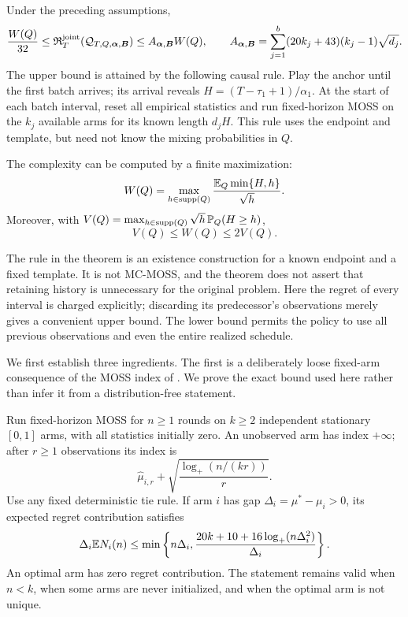 \begin{theorem}
\label{thm:random-positive}
Under the preceding assumptions,
\begin{equation}
 \frac{W(Q)}{32}
 \le \mathfrak R_T^{\mathrm{joint}}
       (\mathcal Q_{T,Q,\boldsymbol\alpha,\boldsymbol B})
 \le A_{\boldsymbol\alpha,\boldsymbol B}W(Q),
 \qquad
 A_{\boldsymbol\alpha,\boldsymbol B}
 =\sum_{j=1}^b(20k_j+43)(k_j-1)\sqrt{d_j}.
 \label{eq:stretch-minimax}
\end{equation}
The upper bound is attained by the following causal rule. Play the
anchor until the first batch arrives; its arrival reveals
$H=(T-\tau_1+1)/\alpha_1$. At the start of each batch interval, reset
all empirical statistics and run fixed-horizon MOSS on the $k_j$
available arms for its known length $d_jH$.
This rule uses the endpoint and template, but need not know the
mixing probabilities in $Q$.

The complexity can be computed by a finite maximization:
\begin{equation}
 W(Q)=\max_{h\in\operatorname{supp}(Q)}
            \frac{\mathbb E_Q\min\{H,h\}}{\sqrt h}.
 \label{eq:stretch-finite}
\end{equation}
Moreover, with
$V(Q)=\max_{h\in\operatorname{supp}(Q)}\sqrt h\,\mathbb P_Q(H\ge h)$,
\begin{equation}
 V(Q)\le W(Q)\le2V(Q).
 \label{eq:stretch-tail}
\end{equation}
\end{theorem}

The rule in the theorem is an existence construction for a known
endpoint and a fixed template. It is not MC-MOSS, and the theorem does
not assert that retaining history is unnecessary for the original
problem. Here the regret of every interval is charged explicitly;
discarding its predecessor's observations merely gives a convenient
upper bound. The lower bound permits the policy to use all previous
observations and even the entire realized schedule.

We first establish three ingredients. The first is a deliberately
loose fixed-arm consequence of the MOSS index of
\citet{audibert2009minimax}. We prove the exact bound used here rather
than infer it from a distribution-free statement.

\begin{lemma}
\label{lem:stretch-local-gap}
Run fixed-horizon MOSS for $n\ge1$ rounds on $k\ge2$ independent
stationary $[0,1]$ arms, with all statistics initially zero. An
unobserved arm has index $+\infty$; after $r\ge1$ observations its
index is
\[
 \widehat\mu_{i,r}
       +\sqrt{\frac{\log_+(n/(kr))}{r}}.
\]
Use any fixed deterministic tie rule. If arm $i$ has gap
$\Delta_i=\mu^*-\mu_i>0$, its expected regret contribution satisfies
\begin{equation}
 \Delta_i\mathbb E N_i(n)
 \le \min\left\{n\Delta_i,
   \frac{20k+10+16\log_+(n\Delta_i^2)}{\Delta_i}\right\}.
 \label{eq:stretch-local-gap}
\end{equation}
An optimal arm has zero regret contribution. The statement remains
valid when $n<k$, when some arms are never initialized, and when the
optimal arm is not unique.
\end{lemma}

